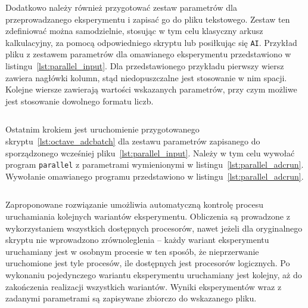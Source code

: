 \begin{listing}[htb]
\inputminted{octave}{skrypty/octave_adcbatch.m}
\end{listing}

Dodatkowo należy również przygotować zestaw parametrów dla przeprowadzanego eksperymentu i zapisać go do pliku tekstowego. Zestaw ten zdefiniować można samodzielnie, stosując w tym celu klasyczny arkusz kalkulacyjny, za pomocą odpowiedniego skryptu lub posiłkując się \texttt{AI}. Przykład pliku z zestawem parametrów dla omawianego eksperymentu przedstawiono w listingu~\ref{lst:parallel_input}. Dla przedstawionego przykładu pierwszy wiersz zawiera nagłówki kolumn, stąd niedopuszczalne jest stosowanie w nim spacji. Kolejne wiersze zawierają wartości wskazanych parametrów, przy czym możliwe jest stosowanie dowolnego formatu liczb.

\begin{listing}[htb]
\inputminted{text}{skrypty/parallel_input.csv}
\end{listing}

Ostatnim krokiem jest uruchomienie przygotowanego skryptu~\ref{lst:octave_adcbatch} dla zestawu parametrów zapisanego do sporządzonego wcześniej pliku~\ref{lst:parallel_input}. Należy w tym celu wywołać program \texttt{parallel} z parametrami wymienionymi w listingu~\ref{lst:parallel_adcrun}. Wywołanie omawianego programu przedstawiono w listingu~\ref{lst:parallel_adcrun}.

\begin{listing}[htb]
\inputminted{bash}{skrypty/parallel_adcrun.sh}
\end{listing}
 
Zaproponowane rozwiązanie umożliwia automatyczną kontrolę procesu uruchamiania kolejnych wariantów eksperymentu. Obliczenia są prowadzone z wykorzystaniem wszystkich dostępnych procesorów, nawet jeżeli dla oryginalnego skryptu nie wprowadzono zrównoleglenia -- każdy wariant eksperymentu uruchamiany jest w osobnym procesie w ten sposób, że nieprzerwanie uruchomione jest tyle procesów, ile dostępnych jest procesorów logicznych. Po wykonaniu pojedynczego wariantu eksperymentu uruchamiany jest kolejny, aż do zakończenia realizacji wszystkich wariantów. Wyniki eksperymentów wraz z zadanymi parametrami są zapisywane zbiorczo do wskazanego pliku. 
 
